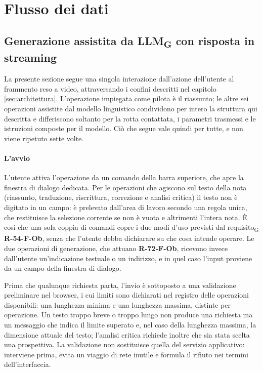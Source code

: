 \documentclass[a4paper, 10pt]{article}
\begin{document}
\section{Flusso dei dati}
\label{sec:flusso-dati}

\subsection{Generazione assistita da LLM\textsubscript{G} con risposta in streaming}
\label{sec:flusso-streaming}
La presente sezione segue una singola interazione dall'azione dell'utente al frammento reso a video, attraversando i confini descritti nel capitolo \ref{sec:architettura}. L'operazione impiegata come pilota è il riassunto; le altre sei operazioni assistite dal modello linguistico condividono per intero la struttura qui descritta e differiscono soltanto per la rotta contattata, i parametri trasmessi e le istruzioni composte per il modello. Ciò che segue vale quindi per tutte, e non viene ripetuto sette volte.

\paragraph{L'avvio}
L'utente attiva l'operazione da un comando della barra superiore, che apre la finestra di dialogo dedicata. Per le operazioni che agiscono sul testo della nota (riassunto, traduzione, riscrittura, correzione e analisi critica) il testo non è digitato in un campo: è prelevato dall'area di lavoro secondo una regola unica, che restituisce la selezione corrente se non è vuota e altrimenti l'intera nota. È così che una sola coppia di comandi copre i due modi d'uso previsti dal requisito\textsubscript{G} \textbf{R-54-F-Ob}, senza che l'utente debba dichiarare su che cosa intende operare. Le due operazioni di generazione, che attuano \textbf{R-72-F-Ob}, ricevono invece dall'utente un'indicazione testuale o un indirizzo, e in quel caso l'input proviene da un campo della finestra di dialogo.

Prima che qualunque richiesta parta, l'invio è sottoposto a una validazione preliminare nel browser, i cui limiti sono dichiarati nel registro delle operazioni disponibili: una lunghezza minima e una lunghezza massima, distinte per operazione. Un testo troppo breve o troppo lungo non produce una richiesta ma un messaggio che indica il limite superato e, nel caso della lunghezza massima, la dimensione attuale del testo; l'analisi critica richiede inoltre che sia stata scelta una prospettiva. La validazione non sostituisce quella del servizio applicativo: interviene prima, evita un viaggio di rete inutile e formula il rifiuto nei termini dell'interfaccia.
\end{document}
